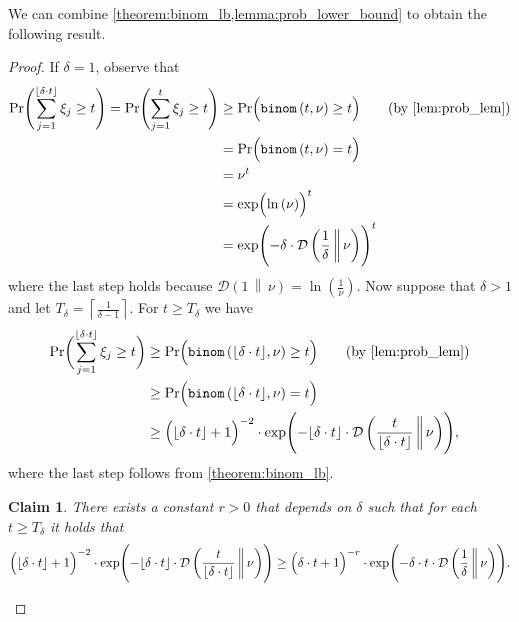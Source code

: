 \documentclass[letterpaper,11pt]{article}
\newcommand{\floor}[1]{ {\left\lfloor #1 \right\rfloor}}
\newcommand{\ceil}[1]{ {\left\lceil #1 \right\rceil}}
\newcommand{\1}[1]{\mathds{1}\left[#1\right]}
\newcommand{\prbinom}{\textnormal{\texttt{binom}}}
\newcommand{\D}[2]{\mathcal{D}\left(#1\, \middle\|\,#2 \right)}
\newtheorem{claim}[theorem]{Claim}
\begin{document}
We can combine \cref{theorem:binom_lb,lemma:prob_lower_bound} to obtain the following result.
\probmainresult*

\begin{proof}
		If $\delta = 1$, observe that
		\begin{align}
			\Pr\Biggl( \sum_{j = 1}^{\floor{\delta \cdot t}} \xi_j \geq t\Biggr) = \Pr\Biggl( \sum_{j = 1}^{t} \xi_j \geq t\Biggr) &\geq \Pr\Bigl( \prbinom\left( t, \nu \right) \geq  t \Bigr)\tag{by \cref{lem:prob_lem}}\\
											     &= \Pr\Bigl( \prbinom\left( t, \nu \right) =  t \Bigr)\notag \\
											     &= \nu^{t}\notag \\
											     &= \exp\Bigl(\ln\left( \nu \right) \Bigr)^{t}\notag\\
											     &= \exp\Biggl(-\delta \cdot \D{\frac{1}{\delta}}{\nu}\Biggr)^{t}\notag
		\end{align}
		where the last step holds because $\D{1}{\nu} = \ln\left( \frac{1}{\nu} \right)$.
		Now suppose that $\delta > 1$ and let $T_\delta= \ceil{\frac{1}{\delta-1}}$. For $t \geq T_\delta$ we have
		\begin{align}
			\Pr\biggl( \sum_{j = 1}^{\floor{\delta \cdot t}} \xi_j \geq t\biggr) &\geq \Pr\Bigl( \prbinom\left( \floor{\delta\cdot t}, \nu \right) \geq  t \Bigr)\tag{by \cref{lem:prob_lem}}\\			
					  &\geq \Pr\Bigl( \prbinom\left( \floor{\delta\cdot t}, \nu \right) =  t \Bigr)\notag\\
					  &\geq \Bigl( \floor{\delta\cdot t} + 1 \Bigr) ^{-2} \cdot \exp\Biggl( - \floor{\delta \cdot t} \cdot \D{\frac{t}{\floor{\delta \cdot t}}}{\nu}\Biggr)\label{eq:X_j_prob_last_step},
	  	\end{align}
		where the last step follows from \cref{theorem:binom_lb}.

		\begin{claim}\label{claim:technical_bound}
			There exists a constant $r > 0$ that depends on $\delta$ such that for each $t \geq T_{\delta}$ it holds that
			\begin{equation*}
				\Bigl( \floor{\delta\cdot t} + 1 \Bigr) ^{-2} \cdot \exp\Biggl( - \floor{\delta \cdot t} \cdot \D{\frac{t}{\floor{\delta \cdot t}}}{\nu}\Biggr) \geq \Bigl( \delta\cdot t + 1 \Bigr) ^{-r} \cdot \exp\Biggl( - \delta \cdot t \cdot \D{\frac{1}{\delta}}{\nu}\Biggr).
			\end{equation*}			
		\end{claim}


\end{proof}
\end{document}
